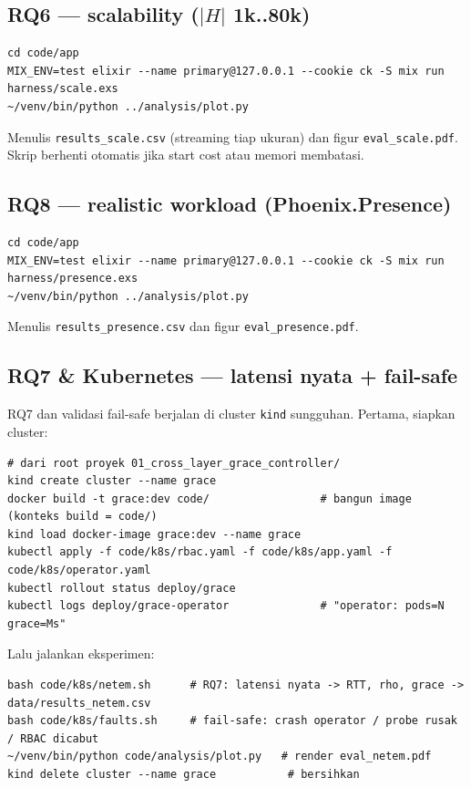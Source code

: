 \documentclass[11pt]{article}
\newcommand{\code}[1]{\texttt{\small #1}}
\begin{document}
\subsection{RQ6 --- scalability ($|H|$ 1k..80k)}
\begin{lstlisting}[style=sh]
cd code/app
MIX_ENV=test elixir --name primary@127.0.0.1 --cookie ck -S mix run harness/scale.exs
~/venv/bin/python ../analysis/plot.py
\end{lstlisting}
Menulis \code{results\_scale.csv} (streaming tiap ukuran) dan figur \code{eval\_scale.pdf}. Skrip
berhenti otomatis jika start cost atau memori membatasi.

\subsection{RQ8 --- realistic workload (Phoenix.Presence)}
\begin{lstlisting}[style=sh]
cd code/app
MIX_ENV=test elixir --name primary@127.0.0.1 --cookie ck -S mix run harness/presence.exs
~/venv/bin/python ../analysis/plot.py
\end{lstlisting}
Menulis \code{results\_presence.csv} dan figur \code{eval\_presence.pdf}.

\subsection{RQ7 \& Kubernetes --- latensi nyata + fail-safe}
RQ7 dan validasi fail-safe berjalan di cluster \code{kind} sungguhan. Pertama, siapkan cluster:
\begin{lstlisting}[style=sh]
# dari root proyek 01_cross_layer_grace_controller/
kind create cluster --name grace
docker build -t grace:dev code/                 # bangun image (konteks build = code/)
kind load docker-image grace:dev --name grace
kubectl apply -f code/k8s/rbac.yaml -f code/k8s/app.yaml -f code/k8s/operator.yaml
kubectl rollout status deploy/grace
kubectl logs deploy/grace-operator              # "operator: pods=N grace=Ms"
\end{lstlisting}
Lalu jalankan eksperimen:
\begin{lstlisting}[style=sh]
bash code/k8s/netem.sh      # RQ7: latensi nyata -> RTT, rho, grace -> data/results_netem.csv
bash code/k8s/faults.sh     # fail-safe: crash operator / probe rusak / RBAC dicabut
~/venv/bin/python code/analysis/plot.py   # render eval_netem.pdf
kind delete cluster --name grace           # bersihkan
\end{lstlisting}
\end{document}
